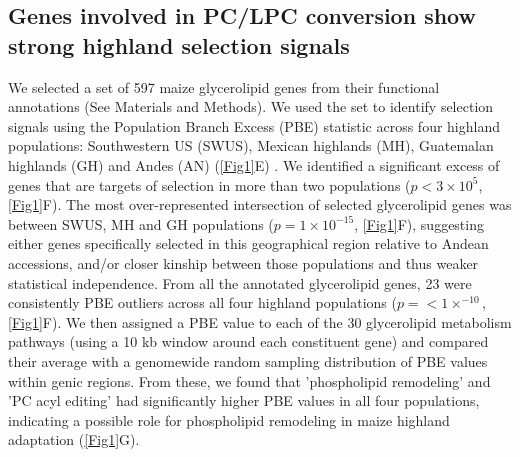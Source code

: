 \documentclass[9pt,twocolumn,twoside,lineno]{biorxiv}
\begin{document}
\subsection{Genes involved in PC/LPC conversion show strong highland selection signals} 
We selected a set of 597 maize glycerolipid genes from their functional annotations (See Materials and Methods). 
We used the set to identify selection signals using the Population Branch Excess (PBE) \cite{Pool2017-oa} statistic across four highland populations: Southwestern US (SWUS), Mexican highlands (MH), Guatemalan highlands (GH) and Andes (AN) (\cref{Fig1}E) \cite{Wang2020-mp}. 
We identified a significant excess of genes that are targets of selection in more than two populations ($ p< 3 \times 10^{5}$, \ref{Fig1}F).
The most over-represented intersection of selected glycerolipid genes was between SWUS, MH and GH populations ($p = 1  \times 10 ^{-15} $, \cref{Fig1}F), suggesting either genes specifically selected in this geographical region relative to Andean accessions, and/or closer kinship between those populations and thus weaker statistical independence.
From all the annotated glycerolipid genes, 23 were consistently PBE outliers across all four highland populations ($p =<1  \times  ^{-10}$, \cref{Fig1}F).
We then assigned a PBE value to each of the 30 glycerolipid metabolism pathways (using a 10 kb window around each constituent gene)  and compared their average with a genomewide random sampling distribution of PBE values within genic regions. 
From these, we found that 'phospholipid remodeling' and 'PC acyl editing' had significantly higher PBE values in all four populations, indicating a possible role for phospholipid remodeling in maize highland adaptation
(\cref{Fig1}G). 
\end{document}
